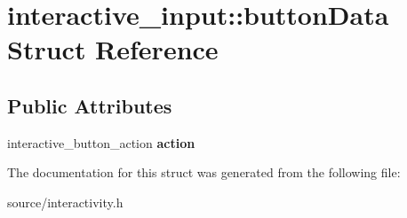 \hypertarget{structinteractive__input_1_1button_data}{}\section{interactive\+\_\+input\+:\+:button\+Data Struct Reference}
\label{structinteractive__input_1_1button_data}
\subsection*{Public Attributes}
\begin{DoxyCompactItemize}
\item 
\mbox{\label{structinteractive__input_1_1button_data_a5010e2dd27ff31ebb509426689f6596a}} 
interactive\+\_\+button\+\_\+action {\bfseries action}
\end{DoxyCompactItemize}


The documentation for this struct was generated from the following file\+:\begin{DoxyCompactItemize}
\item 
source/interactivity.\+h\end{DoxyCompactItemize}
